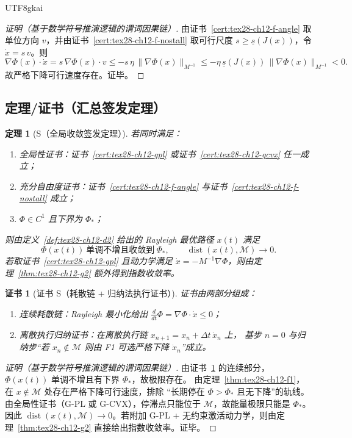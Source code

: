 \documentclass[12pt]{article}
\newtheorem{theorem}{定理}[section]
\newtheorem{Certificate}{证书}[section]
\begin{document}
\begin{CJK*}{UTF8}{gkai}
\begin{proof}[证明（基于数学符号推演逻辑的谓词因果链）]
由证书~\ref{cert:tex28-ch12-f-angle} 取单位方向 $v$，并由证书~\ref{cert:tex28-ch12-f-nostall}
取可行尺度 $s\ge \underline s(J(x))$，令 $\dot x=s\,v$。则
\[
  \nabla\Phi(x)\cdot\dot x
  =
  s\,\nabla\Phi(x)\cdot v
  \le
  -s\,\eta\,\|\nabla\Phi(x)\|_{M^{-1}}
  \le
  -\eta\,\underline s(J(x))\,\|\nabla\Phi(x)\|_{M^{-1}}<0.
\]
故严格下降可行速度存在。证毕。
\end{proof}

\subsection{定理/证书（汇总签发定理）}
\label{subsec:tex28-ch12-summary-theorem}

\begin{theorem}[S（全局收敛签发定理）]
\label{thm:tex28-ch12-s}
若同时满足：
\begin{enumerate}
  \item 全局性证书：证书~\ref{cert:tex28-ch12-gpl} 或证书~\ref{cert:tex28-ch12-gcvx} 任一成立；
  \item 充分自由度证书：证书~\ref{cert:tex28-ch12-f-angle} 与证书~\ref{cert:tex28-ch12-f-nostall} 成立；
  \item $\Phi\in C^1$ 且下界为 $\Phi_*$；
\end{enumerate}
则由定义~\ref{def:tex28-ch12-d2} 给出的 Rayleigh 最优路径 $x(t)$ 满足
\[
  \Phi(x(t))\ \text{单调不增且收敛到}\ \Phi_*,
  \qquad
  \operatorname{dist}(x(t),\mathcal{M})\to0.
\]
若取证书~\ref{cert:tex28-ch12-gpl} 且动力学满足 $\dot x=-M^{-1}\nabla\Phi$，则由定理~\ref{thm:tex28-ch12-g2}
额外得到指数收敛率。
\end{theorem}

\begin{Certificate}[证书 S（耗散链 + 归纳法执行证书）]
\label{cert:tex28-ch12-s}
证书由两部分组成：
\begin{enumerate}
  \item 连续耗散链：Rayleigh 最小化给出 $\frac{d}{dt}\Phi=\nabla\Phi\cdot\dot x\le0$；
  \item 离散执行归纳证书：在离散执行链 $x_{n+1}=x_n+\Delta t\,\dot x_n$ 上，
  基步 $n=0$ 与归纳步“若 $x_n\notin\mathcal{M}$ 则由 F1 可选严格下降 $\dot x_n$”成立。
\end{enumerate}
\end{Certificate}

\begin{proof}[证明（基于数学符号推演逻辑的谓词因果链）]
由证书~\ref{cert:tex28-ch12-s} 的连续部分，$\Phi(x(t))$ 单调不增且有下界 $\Phi_*$，故极限存在。
由定理~\ref{thm:tex28-ch12-f1}，在 $x\notin\mathcal{M}$ 处存在严格下降可行速度，排除
“长期停在 $\Phi>\Phi_*$ 且无下降”的轨线。
由全局性证书（G-PL 或 G-CVX），停滞点只能位于 $\mathcal{M}$，故能量极限只能是 $\Phi_*$。
因此 $\operatorname{dist}(x(t),\mathcal{M})\to0$。若附加 G-PL + 无约束激活动力学，则由定理~\ref{thm:tex28-ch12-g2}
直接给出指数收敛率。证毕。
\end{proof}


\end{CJK*}
\end{document}
